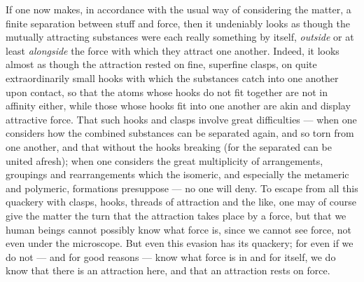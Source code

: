 \documentclass[12pt,a4paper]{book}
\begin{document}
If one now makes, in accordance with the usual way of considering the matter, a
finite separation between stuff and force, then it undeniably looks as though
the mutually attracting substances were each really something by itself,
\emph{outside} or at least \emph{alongside} the force with which they attract
one another. Indeed, it looks almost as though the attraction rested on fine,
superfine clasps, on quite extraordinarily small hooks with which the
substances catch into one another upon contact, so that the atoms whose hooks
do not fit together are not in affinity either, while those whose hooks fit
into one another are akin and display attractive force. That such hooks and
clasps involve great difficulties --- when one considers how the combined
substances can be separated again, and so torn from one another, and that
without the hooks breaking (for the separated can be united afresh); when one
considers the great multiplicity of arrangements, groupings and rearrangements
which the isomeric, and especially the metameric and polymeric, formations
presuppose --- no one will deny. To escape from all this quackery with clasps,
hooks, threads of attraction and the like, one may of course give the matter
the turn that the attraction takes place by a force, but that we human beings
cannot possibly know what force is, since we cannot see force, not even under
the microscope. But even this evasion has its quackery; for even if we do not
--- and for good reasons --- know
what force is in and for itself, we do know that there is an attraction here,
and that an attraction rests on force.
\end{document}
